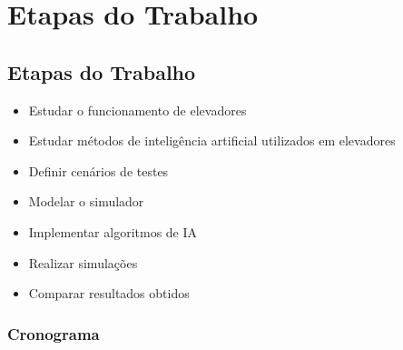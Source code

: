 \chapter{\label{chap:stages}Etapas do Trabalho}

\section{Etapas do Trabalho}

\begin{itemize}
    \item Estudar o funcionamento de elevadores
    \item Estudar métodos de inteligência artificial utilizados em elevadores
    \item Definir cenários de testes
    \item Modelar o simulador
    \item Implementar algoritmos de IA
    \item Realizar simulações
    \item Comparar resultados obtidos
\end{itemize}

\subsection{Cronograma}